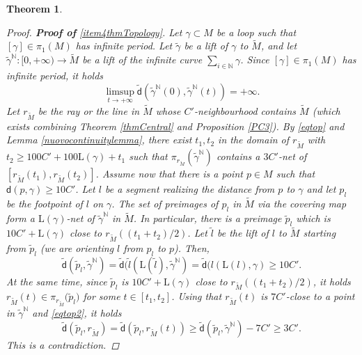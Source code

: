 \documentclass[10pt]{article}
\newtheorem{thm}{Theorem}[section]
\theoremstyle{definition}
\newcommand{\bb}[1]{\mathbb{#1}}
\newcommand{\length}{\mathrm{L}}
\newcommand{\sd}{\mathsf{d}}
\begin{document}
\begin{thm}
\begin{proof}
          \textbf{Proof of} \ref{item4thmTopology}. Let $\gamma \subset M$ be a loop such that $[\gamma] \in \pi_1(M)$ has infinite period. Let $\tilde{\gamma}$ be a lift of $\gamma$ to $\tilde{M}$, and let $\tilde{\gamma}^{\bb{N}}:[0,+\infty) \to \tilde{M}$ be a lift of the infinite curve $\sum_{i \in \bb{N}} \gamma$. Since $[\gamma] \in \pi_1(M)$ has infinite period, it holds
          \begin{equation} \label{eqtop}
          \limsup_{t \to + \infty} \tilde{\sd}(\tilde{\gamma}^{\bb{N}}(0),\tilde{\gamma}^{\bb{N}}(t))= + \infty.
          \end{equation}
          Let $r_{\tilde{M}}$ be the ray or the line in $\tilde{M}$ whose $C'$-neighbourhood contains $\tilde{M}$ (which exists combining Theorem \ref{thmCentral} and Proposition \ref{PC3}). By \eqref{eqtop} and Lemma \ref{nuovocontinuitylemma}, there exist $t_1,t_2$ in the domain of $r_{\tilde{M}}$ with $t_2 \geq 100C'+100\length(\gamma)+t_1$ such that $\pi_{r_{\tilde{M}}}(\tilde{\gamma}^{\bb{N}})$ contains a $3C'$-net of $[r_{\tilde{M}}(t_1),r_{\tilde{M}}(t_2)]$. Assume now that there is a point $p \in M$ such that $\sd(p,\gamma) \geq 10C'$. Let $l$ be a segment realizing the distance from $p$ to $\gamma$ and let $p_l$ be the footpoint of $l$ on $\gamma$. The set of preimages of $p_l$ in $\tilde{M}$ via the covering map form a $\length(\gamma)$-net of $\tilde{\gamma}^{\bb{N}}$ in $\tilde{M}$. In particular, there is a preimage $\tilde{p}_l$ which is $10C'+\length(\gamma)$ close to $r_{\tilde{M}}((t_1+t_2)/2)$. Let $\tilde{l}$ be the lift of $l$ to $\tilde{M}$ starting from $\tilde{p}_l$ (we are orienting $l$ from $p_l$ to $p$). Then,
          \begin{equation} \label{eqtop2}
          \tilde{\sd}(\tilde{p}_l,\tilde{\gamma}^{\bb{N}})=\tilde{\sd}(\tilde{l}(\length(\tilde{l}),\tilde{\gamma}^{\bb{N}})=\tilde{\sd}(l(\length(l),\gamma) \geq 10C'.
          \end{equation}
          At the same time, since $\tilde{p}_l$ is $10C'+\length(\gamma)$ close to $r_{\tilde{M}}((t_1+t_2)/2)$, it holds $r_{\tilde{M}}(t) \in \pi_{r_{\tilde{M}}}\big( \tilde{p}_l \big)$ for some $t \in[t_1,t_2]$. Using that $r_{\tilde{M}}(t)$ is $7C'$-close to a point in $\tilde{\gamma}^{\bb{N}}$ and \eqref{eqtop2}, it holds
          \[
          \tilde{\sd}(\tilde{p}_l,r_{\tilde{M}})=\tilde{\sd}(\tilde{p}_l,r_{\tilde{M}}(t)) \geq \tilde{\sd}(\tilde{p}_l,\tilde{\gamma}^{\bb{N}})-7C' \geq 3C'.
          \]
          This is a contradiction.
    \end{proof}
\end{thm}
\end{document}
